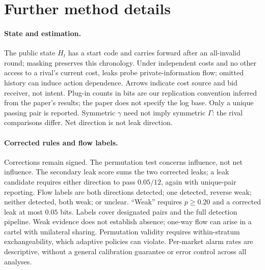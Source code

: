\section{Further method details}
\label{app:methods}
\paragraph{State and estimation.} The public state $H_t$ has a start code
and carries forward after an all-invalid round; masking preserves this
chronology. Under independent costs and no other access to a rival's
current cost, leaks probe private-information flow; omitted history can
induce action dependence. Arrows indicate cost source and bid receiver, not
intent. Plug-in counts in bits are our replication convention inferred from
the paper's results; the paper does not specify the log base. Only a unique
passing pair is reported. Symmetric $\gamma$ need not imply symmetric
$\Gamma$: the rival comparisons differ. Net direction is not leak direction.

\paragraph{Corrected rules and flow labels.} Corrections remain signed. The
permutation test concerns influence, not net influence. The secondary leak
score sums the two corrected leaks; a leak candidate requires either
direction to pass $0.05/12$, again with unique-pair reporting. Flow labels
are both directions detected; one detected, reverse weak; neither detected,
both weak; or unclear. ``Weak'' requires $p\ge0.20$ and a corrected leak at
most $0.05$ bits. Labels cover designated pairs and the full detection
pipeline. Weak evidence does not establish absence; one-way flow can arise
in a cartel with unilateral sharing. Permutation validity requires
within-stratum exchangeability, which adaptive policies can violate.
Per-market alarm rates are descriptive, without a general calibration
guarantee or error control across all analyses.

